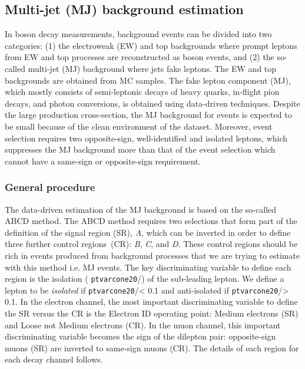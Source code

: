 \subsection{Multi-jet (MJ) background estimation}
\label{subsec:zmjbackground}
In \Zboson boson decay measurements, background events can be divided into two categories: (1) the electroweak (EW) and top backgrounds where prompt leptons from EW and top processes are reconstructed as \Zboson boson events, and (2) the so-called multi-jet (MJ) background where jets fake leptons. The EW and top backgrounds are obtained from MC samples. The fake lepton component (MJ), which mostly consists of semi-leptonic decays of heavy quarks, in-flight pion decays, and photon conversions, is obtained using data-driven techniques. Despite the large production cross-section, the MJ background for \Zboson events is expected to be small because of the clean environment of the \lowmu dataset. Moreover, \Zboson event selection requires two opposite-sign, well-identified and isolated leptons, which suppresses the MJ background more than that of the \Wboson event selection which cannot have a same-sign or opposite-sign requirement.

\subsubsection{General procedure}
\label{sssec:ZMJ_procedure}

The data-driven estimation of the MJ background is based on the so-called ABCD method. The ABCD method requires two selections that form part of the definition of the signal region (SR), \textit{A}, which can be inverted in order to define three further control regions~(CR): \textit{B}, \textit{C}, and \textit{D}. These control regions should be rich in events produced from background processes that we are trying to estimate with this method i.e. MJ events. The key discriminating variable to define each region is the isolation ( \texttt{ptvarcone20}/\pT ) of the sub-leading lepton. We define a lepton to be \textit{isolated} if \texttt{ptvarcone20}/\pT < 0.1 and anti-isolated if \texttt{ptvarcone20}/\pT > 0.1. In the electron channel, the most important discriminating variable to define the SR versus the CR is the Electron ID operating point: Medium electrons (SR) and Loose not Medium electrons (CR). In the muon channel, this important discriminating variable becomes the sign of the dilepton pair: opposite-sign muons (SR) are inverted to same-sign muons (CR). The details of each region for each \Zboson decay channel follows.

